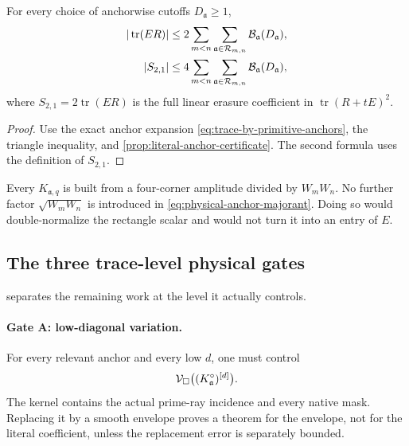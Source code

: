 \begin{corollary}
\label{cor:linear-mixed-sector-majorant}
For every choice of anchorwise cutoffs \(D_{\mathfrak a}\ge1\),
\begin{align}
 |\operatorname{tr}(ER)|
 &\le
 2\sum_{m<n}
 \sum_{\mathfrak a\in\mathcal R_{m,n}}
 \mathcal B_{\mathfrak a}(D_{\mathfrak a}),
\label{eq:trace-plane-certificate}\\
 |S_{2,1}|
 &\le
 4\sum_{m<n}
 \sum_{\mathfrak a\in\mathcal R_{m,n}}
 \mathcal B_{\mathfrak a}(D_{\mathfrak a}),
\label{eq:linear-sector-plane-certificate}
\end{align}
where \(S_{2,1}=2\operatorname{tr}(ER)\) is the full linear erasure
coefficient in \(\operatorname{tr}(R+tE)^2\).
\end{corollary}

\begin{proof}
Use the exact anchor expansion
\eqref{eq:trace-by-primitive-anchors}, the triangle inequality, and
\cref{prop:literal-anchor-certificate}.  The second formula uses the
definition of \(S_{2,1}\).
\end{proof}

\begin{remark}
Every \(K_{\mathfrak a,q}\) is built from a four-corner amplitude divided
by \(W_mW_n\).  No further factor
\(\sqrt{W_mW_n}\) is introduced in
\eqref{eq:physical-anchor-majorant}.  Doing so would double-normalize the
rectangle scalar and would not turn it into an entry of \(E\).
\end{remark}

\subsection{The three trace-level physical gates}

 separates the remaining work at
the level it actually controls.

\paragraph{Gate A: low-diagonal variation.}
For every relevant anchor and every low \(d\), one must control
\[
 \mathcal V_\square\bigl((K^\circ_{\mathfrak a})^{[d]}\bigr).
\]
The kernel contains the actual prime-ray incidence and every native mask.
Replacing it by a smooth envelope proves a theorem for the envelope, not
for the literal coefficient, unless the replacement error is separately
bounded.

